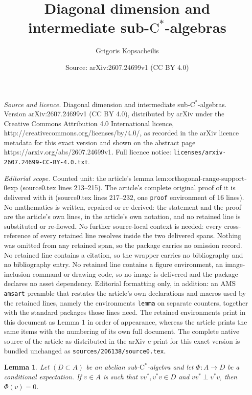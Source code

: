 \documentclass[10pt,a4paper]{amsart}
\title{Diagonal dimension and intermediate sub-\texorpdfstring{$\mathrm{C}^\ast$}{C*}-algebras}
\author{Grigoris Kopsacheilis}
\date{Source: arXiv:2607.24699v1 (CC BY 4.0)}
\newtheorem{lemma}{Lemma}
\begin{document}
\maketitle

\noindent\emph{Source and licence.} Diagonal dimension and intermediate sub-\texorpdfstring{$\mathrm{C}^\ast$}{C*}-algebras. Version arXiv:2607.24699v1 (CC BY 4.0), distributed by arXiv under the Creative Commons Attribution 4.0 International licence, http://creativecommons.org/licenses/by/4.0/, as recorded in the arXiv licence metadata for this exact version and shown on the abstract page https://arxiv.org/abs/2607.24699v1. Full licence notice: \texttt{licenses/arxiv-2607.24699-CC-BY-4.0.txt}.\par\smallskip

\noindent\textit{Editorial scope.} Counted unit: the article's lemma lem:orthogonal-range-support-0exp (source0.tex lines 213--215). The article's complete original proof of it is delivered with it (source0.tex lines 217--232, one \texttt{proof} environment of 16 lines). No mathematics is written, repaired or re-derived: the statement and the proof are the article's own lines, in the article's own notation, and no retained line is substituted or re-flowed.  No further source-local context is needed: every cross-reference of every retained line resolves inside the two delivered spans.  Nothing was omitted from any retained span, so the package carries no omission record.  No retained line contains a citation, so the wrapper carries no bibliography and no bibliography entry.  No retained line contains a figure environment, an image-inclusion command or drawing code, so no image is delivered and the package declares no asset dependency.  Editorial formatting only, in addition: an AMS \texttt{amsart} preamble that restates the article's own declarations and macros used by the retained lines, namely the environments \texttt{lemma} on separate counters, together with the standard packages those lines need.  The retained environments print in this document as Lemma 1 in order of appearance, whereas the article prints the same items with the numbering of its own full document.  The complete native source of the article as distributed in the arXiv e-print for this exact version is bundled unchanged as \texttt{sources/206138/source0.tex}.
\begin{lemma}\label{lem:orthogonal-range-support-0exp}
Let $(D\subset A)$ be an abelian sub-$\mathrm{C}^\ast$-algebra and let $\Phi\colon A\to D$ be a conditional expectation. If $v\in A$ is such that $vv^*, v^*v\in D$ and $vv^*\perp v^*v$, then $\Phi(v)=0$.
\end{lemma}
\end{document}

